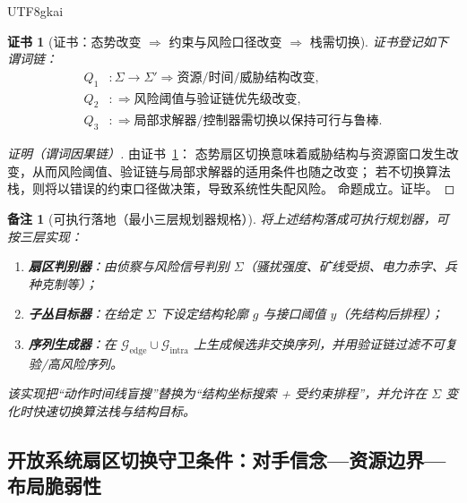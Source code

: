 \documentclass[12pt]{article}
\newtheorem{remark}{备注}[section]
\newtheorem{Certificate}{证书}[section]
\begin{document}
\begin{CJK*}{UTF8}{gkai}
\begin{Certificate}[证书：态势改变 $\Rightarrow$ 约束与风险口径改变 $\Rightarrow$ 栈需切换]
\label{cert:openra-sector-switch-requires-algorithm-switch}
证书登记如下谓词链：
\[
\begin{aligned}
  Q_1 &: \Sigma\to\Sigma'\Rightarrow \text{资源/时间/威胁结构改变},\\
  Q_2 &: \Rightarrow \text{风险阈值与验证链优先级改变},\\
  Q_3 &: \Rightarrow \text{局部求解器/控制器需切换以保持可行与鲁棒}.
\end{aligned}
\]
\end{Certificate}

\begin{proof}[证明（谓词因果链）]
由证书~\ref{cert:openra-sector-switch-requires-algorithm-switch}：
态势扇区切换意味着威胁结构与资源窗口发生改变，从而风险阈值、验证链与局部求解器的适用条件也随之改变；
若不切换算法栈，则将以错误的约束口径做决策，导致系统性失配风险。
命题成立。证毕。
\end{proof}

\begin{remark}[可执行落地（最小三层规划器规格）]
将上述结构落成可执行规划器，可按三层实现：
\begin{enumerate}
  \item \textbf{扇区判别器}：由侦察与风险信号判别 $\Sigma$（骚扰强度、矿线受损、电力赤字、兵种克制等）；
  \item \textbf{子丛目标器}：在给定 $\Sigma$ 下设定结构轮廓 $g$ 与接口阈值 $y$（先结构后排程）；
  \item \textbf{序列生成器}：在 $\mathcal{G}_{\mathrm{edge}}\cup\mathcal{G}_{\mathrm{intra}}$ 上生成候选非交换序列，并用验证链过滤不可复验/高风险序列。
\end{enumerate}
该实现把“动作时间线盲搜”替换为“结构坐标搜索 + 受约束排程”，并允许在 $\Sigma$ 变化时快速切换算法栈与结构目标。
\end{remark}

\subsection{开放系统扇区切换守卫条件：对手信念—资源边界—布局脆弱性}
\label{sec:openra-guard-three-criteria}


\end{CJK*}
\end{document}
